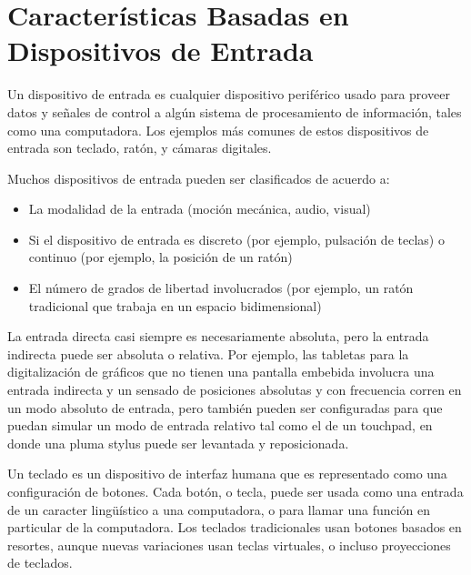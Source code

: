 
\chapter{Características Basadas en Dispositivos de Entrada}

Un dispositivo de entrada es cualquier dispositivo periférico usado
para proveer datos y señales de control a algún sistema de
procesamiento de información, tales como una computadora. Los ejemplos
más comunes de estos dispositivos de entrada son teclado, ratón,
y cámaras digitales.

Muchos dispositivos de entrada pueden ser clasificados de acuerdo a:

\begin{itemize}
  \item La modalidad de la entrada (moción mecánica, audio, visual)
  \item Si el dispositivo de entrada es discreto (por ejemplo,
    pulsación de teclas) o continuo (por ejemplo, la posición de un ratón)
  \item El número de grados de libertad involucrados (por ejemplo, un
    ratón tradicional que trabaja en un espacio bidimensional)
\end{itemize}

La entrada directa casi siempre es necesariamente absoluta, pero la
entrada indirecta puede ser absoluta o relativa. Por ejemplo, las
tabletas para la digitalización de gráficos que no tienen una pantalla
embebida involucra una entrada indirecta y un sensado de posiciones
absolutas y con frecuencia corren en un modo absoluto de entrada, pero
también pueden ser configuradas para que puedan simular un modo de
entrada relativo tal como el de un touchpad, en donde una pluma stylus
puede ser levantada y reposicionada.

Un teclado es un dispositivo de interfaz humana que es representado
como una configuración de botones. Cada botón, o tecla, puede ser
usada como una entrada de un caracter lingüístico a una computadora, o
para llamar una función en particular de la computadora. Los teclados
tradicionales usan botones basados en resortes, aunque nuevas
variaciones usan teclas virtuales, o incluso proyecciones de teclados.

